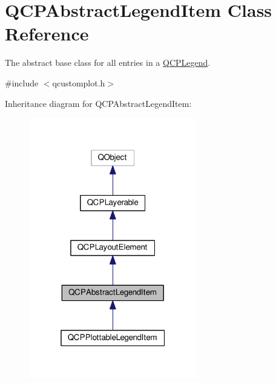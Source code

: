 \hypertarget{classQCPAbstractLegendItem}{}\section{Q\+C\+P\+Abstract\+Legend\+Item Class Reference}
\label{classQCPAbstractLegendItem}


The abstract base class for all entries in a \hyperlink{classQCPLegend}{Q\+C\+P\+Legend}.  




{\ttfamily \#include $<$qcustomplot.\+h$>$}



Inheritance diagram for Q\+C\+P\+Abstract\+Legend\+Item\+:\nopagebreak
\begin{figure}[H]
\begin{center}
\leavevmode
\includegraphics[width=208pt]{classQCPAbstractLegendItem__inherit__graph}
\end{center}
\end{figure}


